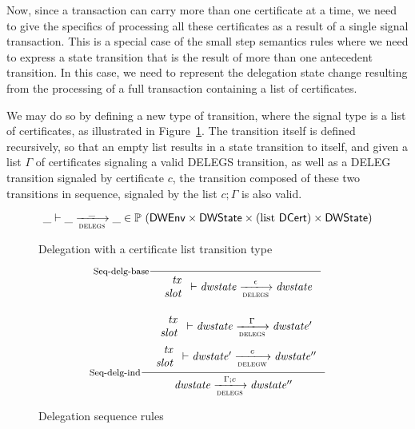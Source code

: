Now, since a transaction can carry more than one certificate at a time, we need
to give the specifics of processing all these certificates as a result of
a single signal transaction. This is a special
case of the small step semantics rules where we need to express a
state transition that is the result of more than one antecedent transition.
In this case, we need to represent the delegation state change resulting
from the processing of a full transaction containing a list of certificates.

We may do so by defining a new type of transition, where the signal type is a
list of certificates, as illustrated in Figure~\ref{fig:type:delegations}.
The transition itself is defined recursively, so that
an empty list results in a state transition to itself, and given
a list $\Gamma$ of certificates signaling a valid DELEGS transition, as well
as a DELEG transition signaled by certificate $c$, the transition
composed of these two transitions in sequence, signaled by the list $c; \Gamma$
is also valid.


\begin{figure}
\begin{equation*}
  \_ \vdash \_ \trans{delegs}{\_} \_ \in
    \powerset (
      \DWEnv \times \DWState \times (\text{list~} \DCert) \times \DWState)
\end{equation*}
\caption{Delegation with a certificate list transition type}
\label{fig:type:delegations}
\end{figure}


\begin{figure}
  \begin{equation}
    \inference[Seq-delg-base]
    {}
    {
      \begin{array}{r}
        \var{tx}\\
        \var{slot}
      \end{array}
      \vdash
      \var{dwstate}
      \trans{delegs}{\epsilon}
      \var{dwstate}
    }
    \label{eq:rule:sequence-delegation-base}
  \end{equation}

  \begin{equation}
    \inference[Seq-delg-ind]
    {
      {
        \begin{array}{r}
          \var{tx}\\
          \var{slot}\\
        \end{array}
      }
      \vdash
      \var{dwstate}
      \trans{delegs}{\Gamma}
      \var{dwstate'}
    \\ ~ \\
    {
      \begin{array}{r}
        \var{tx}\\
        \var{slot}\\
      \end{array}
    }
    \vdash
      \var{dwstate'}
      \trans{delegw}{c}
      \var{dwstate''}
    }
    {
      \var{dwstate}
      \trans{delegs}{\Gamma; c}
      \var{dwstate''}
    }
    \label{eq:rule:sequence-delegation-inductive}
  \end{equation}
  \caption{Delegation sequence rules}
  \label{fig:rules:delegation-sequence}
\end{figure}
